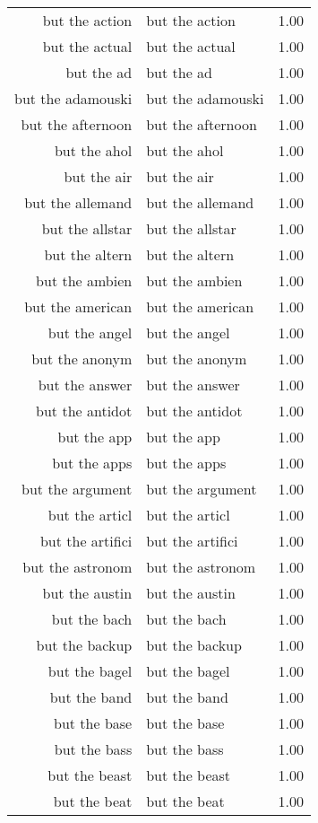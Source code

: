 \begin{table}[ht]
\begin{tabular}{rlr}
  but the action & but the action & 1.00 \\ 
  but the actual & but the actual & 1.00 \\ 
  but the ad & but the ad & 1.00 \\ 
  but the adamouski & but the adamouski & 1.00 \\ 
  but the afternoon & but the afternoon & 1.00 \\ 
  but the ahol & but the ahol & 1.00 \\ 
  but the air & but the air & 1.00 \\ 
  but the allemand & but the allemand & 1.00 \\ 
  but the allstar & but the allstar & 1.00 \\ 
  but the altern & but the altern & 1.00 \\ 
  but the ambien & but the ambien & 1.00 \\ 
  but the american & but the american & 1.00 \\ 
  but the angel & but the angel & 1.00 \\ 
  but the anonym & but the anonym & 1.00 \\ 
  but the answer & but the answer & 1.00 \\ 
  but the antidot & but the antidot & 1.00 \\ 
  but the app & but the app & 1.00 \\ 
  but the apps & but the apps & 1.00 \\ 
  but the argument & but the argument & 1.00 \\ 
  but the articl & but the articl & 1.00 \\ 
  but the artifici & but the artifici & 1.00 \\ 
  but the astronom & but the astronom & 1.00 \\ 
  but the austin & but the austin & 1.00 \\ 
  but the bach & but the bach & 1.00 \\ 
  but the backup & but the backup & 1.00 \\ 
  but the bagel & but the bagel & 1.00 \\ 
  but the band & but the band & 1.00 \\ 
  but the base & but the base & 1.00 \\ 
  but the bass & but the bass & 1.00 \\ 
  but the beast & but the beast & 1.00 \\ 
  but the beat & but the beat & 1.00 \\ 

\end{tabular}
\end{table}
